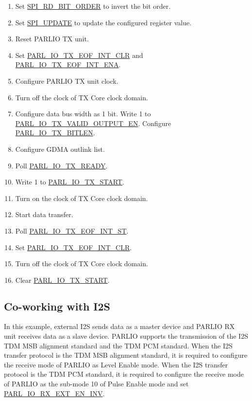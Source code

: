 \documentclass[main\_\_EN.tex]{subfiles}
\begin{document}
\begin{itemize}
\begin{enumerate}
        \item Set \hyperref[fielddesc:SPIRDBITORDER]{SPI\_RD\_BIT\_ORDER} to invert the bit order.
        \item Set \hyperref[fielddesc:SPIUPDATE]{SPI\_UPDATE} to update the configured register value.   
        \item Reset PARLIO TX unit.
        \item Set \hyperref[fielddesc:PARLIOTXEOFINTCLR]{PARL\_IO\_TX\_EOF\_INT\_CLR} and \hyperref[fielddesc:PARLIOTXEOFINTENA]{PARL\_IO\_TX\_EOF\_INT\_ENA}.
        \item Configure PARLIO TX unit clock.
        \item Turn off the clock of TX Core clock domain.
        \item Configure data bus width as 1 bit. Write 1 to \hyperref[fielddesc:PARLIOTXVALIDOUTPUTEN]{PARL\_IO\_TX\_VALID\_OUTPUT\_EN}. Configure \hyperref[fielddesc:PARLIOTXBITLEN]{PARL\_IO\_TX\_BITLEN}. 
        \item Configure GDMA outlink list. 
        \item Poll \hyperref[fielddesc:PARLIOTXREADY]{PARL\_IO\_TX\_READY}.
        \item Write 1 to \hyperref[fielddesc:PARLIOTXSTART]{PARL\_IO\_TX\_START}.
        \item Turn on the clock of TX Core clock domain.
        \item Start data transfer.
        \item Poll \hyperref[fielddesc:PARLIOTXEOFINTST]{PARL\_IO\_TX\_EOF\_INT\_ST}.
        \item Set \hyperref[fielddesc:PARLIOTXEOFINTCLR]{PARL\_IO\_TX\_EOF\_INT\_CLR}.
        \item Turn off the clock of TX Core clock domain.
        \item Clear \hyperref[fielddesc:PARLIOTXSTART]{PARL\_IO\_TX\_START}. 
    \end{enumerate} 
\end{itemize}

\subsection{Co-working with I2S}

In this example, external I2S sends data as a master device and PARLIO RX unit receives data as a slave device. PARLIO supports the transmission of the I2S TDM MSB alignment standard and the TDM PCM standard. When the I2S transfer protocol is the TDM MSB alignment standard, it is required to configure the receive mode of PARLIO as Level Enable mode. When the I2S transfer protocol is the TDM PCM standard, it is required to configure the receive mode of PARLIO as the sub-mode 10 of Pulse Enable mode and set \hyperref[fielddesc:PARLIORXEXTENINV]{PARL\_IO\_RX\_EXT\_EN\_INV}.
\end{document}
